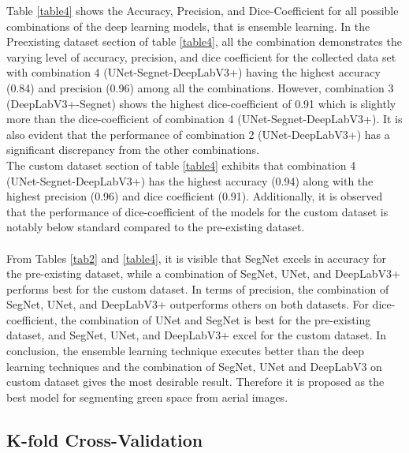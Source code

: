 Table \ref{table4} shows the Accuracy, Precision, and Dice-Coefficient for all possible combinations of the deep learning models, that is ensemble learning. In the Preexisting dataset section of table \ref{table4}, all the combination demonstrates the varying level of accuracy, precision, and dice coefficient for the collected data set with combination 4 (UNet-Segnet-DeepLabV3+) having the highest accuracy (0.84) and precision (0.96) among all the combinations. However, combination 3 (DeepLabV3+-Segnet) shows the highest dice-coefficient of 0.91 which is slightly more than the dice-coefficient of combination 4 (UNet-Segnet-DeepLabV3+). It is also evident that the performance of combination 2 (UNet-DeepLabV3+) has a significant discrepancy from the other combinations.
\\The custom dataset section of table \ref{table4} exhibits that combination 4 \\(UNet-Segnet-DeepLabV3+) has the highest accuracy (0.94) along with the highest precision (0.96) and dice coefficient (0.91). Additionally, it is observed that the performance of dice-coefficient of the models for the custom dataset is notably below standard compared to the pre-existing dataset.%
\\\\From Tables \ref{tab2} and \ref{table4}, it is visible that SegNet excels in accuracy for the pre-existing dataset, while a combination of SegNet, UNet, and DeepLabV3+ performs best for the custom dataset. In terms of precision, the combination of SegNet, UNet, and DeepLabV3+ outperforms others on both datasets. For dice-coefficient, the combination of UNet and SegNet is best for the pre-existing dataset, and SegNet, UNet, and DeepLabV3+ excel for the custom dataset. In conclusion, the ensemble learning technique executes better than the deep learning techniques and the combination of SegNet, UNet and DeepLabV3 on custom dataset gives the most desirable result. Therefore it is proposed as the best model for segmenting green space from aerial images.  

\subsection{K-fold Cross-Validation}

